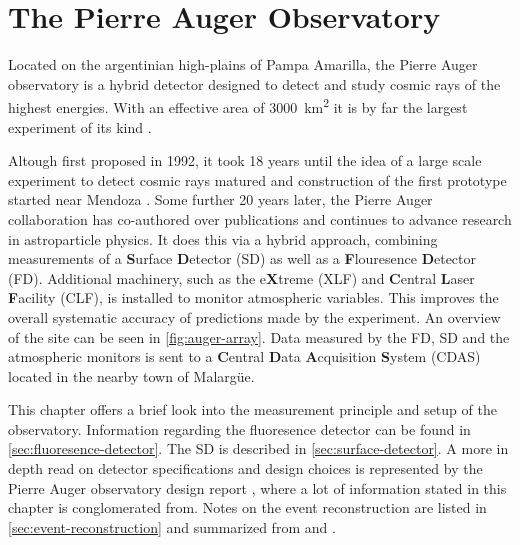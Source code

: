 
\chapter{The Pierre Auger Observatory}
\label{chap:auger-observatory}

Located on the argentinian high-plains of Pampa Amarilla, the Pierre Auger observatory is a hybrid detector designed to detect and study cosmic 
rays of the highest energies. With an effective area of \SI{3000}{\kilo\meter\squared} it is by far the largest experiment of its kind 
\cite{DesignReport}.

Altough first proposed in 1992, it took 18 years until the idea of a large scale experiment to detect cosmic rays matured and construction of the 
first prototype started near Mendoza \cite{AugerTimeline}. Some further 20 years later, the Pierre Auger collaboration has co-authored over \TODO
publications and continues to advance research in astroparticle physics.
It does this via a hybrid approach, combining measurements of a \textbf{S}urface \textbf{D}etector (SD) as well as a \textbf{F}louresence \textbf{D}etector (FD). 
Additional machinery, such as the e\textbf{X}treme (XLF) and \textbf{C}entral \textbf{L}aser \textbf{F}acility (CLF), is installed to monitor atmospheric 
variables. This improves the overall systematic accuracy of predictions made by the experiment. An overview of the site can be seen in \autoref{fig:auger-array}. 
Data measured by the FD, SD and the atmospheric monitors is sent to a \textbf{C}entral \textbf{D}ata \textbf{A}cquisition \textbf{S}ystem (CDAS) located in the 
nearby town of Malargüe.

This chapter offers a brief look into the measurement principle and setup of the observatory. Information regarding the fluoresence detector can be 
found in \autoref{sec:fluoresence-detector}. The SD is described in \autoref{sec:surface-detector}. A more in depth read on detector specifications 
and design choices is represented by the Pierre Auger observatory design report \cite{DesignReport}, where a lot of information stated in this chapter
is conglomerated from. Notes on the event reconstruction are listed in \autoref{sec:event-reconstruction} and summarized from \cite{SDReconstruction} 
and \cite{FDReconstruction}.

